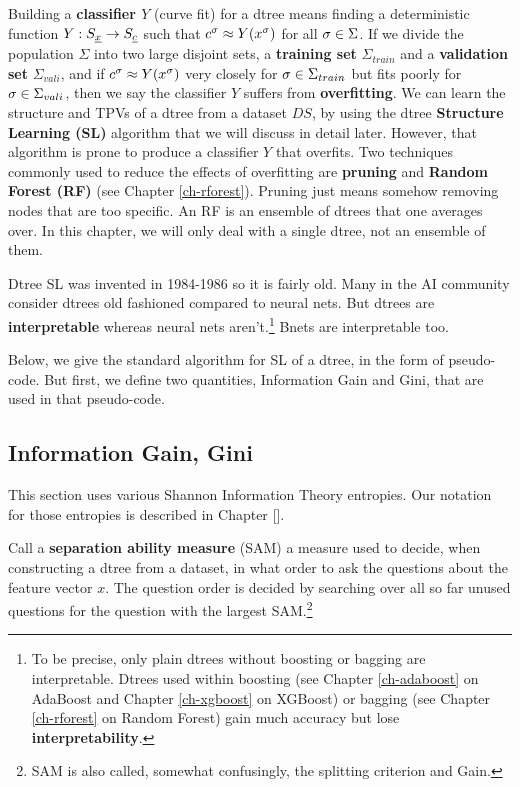 Building a {\bf classifier $Y$} 
(curve fit) for a dtree means
finding a deterministic
function $Y:S_{\underline{x}}\rightarrow S_{\underline{c}}$ 
such that 
$c^\sigma \approx Y(x^\sigma)$
for all $\sigma\in \Sigma$.
If we divide
the population
$\Sigma$ 
into two large 
disjoint
sets, a {\bf training set} $\Sigma_{train}$
and a {\bf validation set} $\Sigma_{vali}$,
and if $c^\sigma \approx Y(x^\sigma)$ very closely
for $\sigma\in \Sigma_{train}$
but fits poorly
for $\sigma\in \Sigma_{vali}$,
then we say the classifier  $Y$
suffers from {\bf overfitting}.
We can learn the structure
and TPVs of a dtree from a dataset $DS$,
by using the
dtree {\bf Structure Learning (SL)}
algorithm that we will 
discuss in detail later. However,
that algorithm
is prone to produce
a classifier $Y$ that overfits.
Two techniques 
commonly used to 
reduce the effects of overfitting
are {\bf pruning}  and 
{\bf Random Forest (RF)}
(see Chapter \ref{ch-rforest}).
Pruning just means somehow
removing nodes that are
too specific. 
An RF is an ensemble of dtrees 
that one averages over.
In this chapter, we will only deal
with a single dtree,
not an ensemble of them. 

Dtree SL was invented in 1984-1986 so it
is fairly old.
Many in the AI
community 
consider dtrees old fashioned
compared to neural nets.
But dtrees 
are {\bf interpretable} whereas neural nets aren't.\footnote{
To be precise, only
plain dtrees without boosting or
 bagging
are interpretable.
Dtrees used within boosting
(see Chapter \ref{ch-adaboost} on AdaBoost
and
Chapter \ref{ch-xgboost} on XGBoost)
or bagging
(see Chapter \ref{ch-rforest} on Random Forest)
gain much
accuracy but lose
{\bf interpretability}.}
Bnets are interpretable too.


Below,
we give the standard
algorithm for SL
of a dtree, in the form
of pseudo-code.
But first,
we define
two quantities,
Information Gain and
Gini,
that are 
used in that 
pseudo-code.


\subsection{Information Gain, Gini}
This section uses various Shannon Information Theory
entropies. Our 
notation for those
entropies
is described in Chapter [].


Call a {\bf separation ability measure} (SAM)
a measure used 
to decide, when 
constructing a dtree from a dataset,
in what order 
to ask the questions
about the feature vector $x$.
The question order is decided
by searching 
over all so far unused questions
for the question with 
the largest SAM.\footnote{SAM
is also called, somewhat
confusingly, the splitting
criterion and Gain.}



